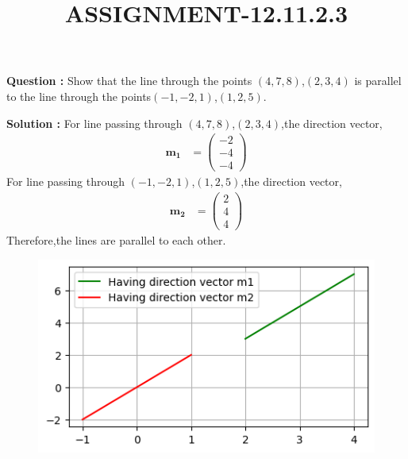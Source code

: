 \documentclass[12pt]{article}
\providecommand{\brak}[1]{\ensuremath{\left(#1\right)}}
\providecommand{\myvec}[1]{\ensuremath{\begin{pmatrix}#1\end{pmatrix}}}
\let\vec\mathbf
\begin{document}
\title{\textbf{ASSIGNMENT-12.11.2.3}}
\date{}
\maketitle
\textbf{Question :} Show that the line through the points \brak{4,7,8},\brak{2,3,4} is parallel to the line through the points\brak{-1,-2,1},\brak{1,2,5}.

\textbf{Solution :}
For line passing through \brak{4,7,8},\brak{2,3,4},the direction vector,\begin{align}
    \vec{m_1}&=\myvec{-2\\-4\\-4}
\end{align}
For line passing through \brak{-1,-2,1},\brak{1,2,5},the direction vector,\begin{align}
    \vec{m_2}&=\myvec{2\\4\\4}
\end{align}
Therefore,the lines are parallel to each other.
\begin{figure}[H]
    \centering
    \includegraphics[width=\columnwidth]{fig/12.11.2.3.png}
    \caption{}
    \label{12.11.2.3}
\end{figure}
\end{document}
